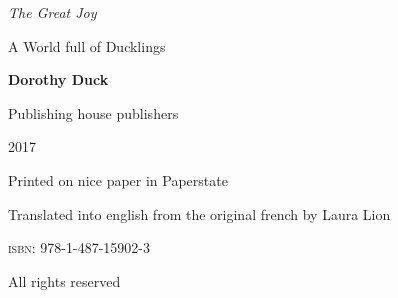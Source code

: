 \documentclass[a5paper]{memoir}
\begin{document}
\pagestyle{empty}
\vspace*{.3\textheight}
{\hfill\huge\itshape The Great Joy\par}

{\hfill\Large A World full of Ducklings\par}

\vspace{.1\textwidth}
{\centering\textbf{Dorothy Duck}\par}

\vfill
{\centering
Publishing house publishers\par
2017\par}
\clearpage
\small
Printed on nice paper in Paperstate

\bigskip

Translated into english from the original french by Laura Lion

\vspace*{\fill}
\textsc{isbn:} 978-1-487-15902-3

All rights reserved
\end{document}
